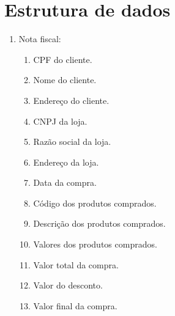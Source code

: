 \section{Estrutura de dados}

\begin{enumerate}
	\item Nota fiscal: \label{uc001_ed:1}
	\begin{enumerate}
		\item CPF do cliente.
		\item Nome do cliente.
		\item Endereço do cliente.
		\item CNPJ da loja.
		\item Razão social da loja.
		\item Endereço da loja.
		\item Data da compra.
		\item Código dos produtos comprados.
		\item Descrição dos produtos comprados.
		\item Valores dos produtos comprados.
		\item Valor total da compra.
		\item Valor do desconto.
		\item Valor final da compra.
	\end{enumerate}
\end{enumerate}






